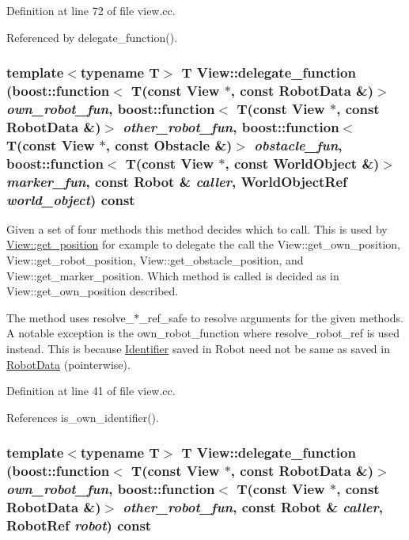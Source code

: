 Definition at line 72 of file view.cc.

Referenced by delegate\_\-function().\hypertarget{class_view_7eccca274db6bd4da79a294e463de06c}{
\subsubsection[delegate\_\-function]{\setlength{\rightskip}{0pt plus 5cm}template$<$typename T$>$ T View::delegate\_\-function (boost::function$<$ T(const {\bf View} $\ast$, const {\bf RobotData} \&)$>$ {\em own\_\-robot\_\-fun}, \/  boost::function$<$ T(const {\bf View} $\ast$, const {\bf RobotData} \&)$>$ {\em other\_\-robot\_\-fun}, \/  boost::function$<$ T(const {\bf View} $\ast$, const Obstacle \&)$>$ {\em obstacle\_\-fun}, \/  boost::function$<$ T(const {\bf View} $\ast$, const {\bf WorldObject} \&)$>$ {\em marker\_\-fun}, \/  const Robot \& {\em caller}, \/  WorldObjectRef {\em world\_\-object}) const}}
\label{class_view_7eccca274db6bd4da79a294e463de06c}


Given a set of four methods this method decides which to call. This is used by \hyperlink{class_view_58fde47c2b683d13f4d038d3e9b37093}{View::get\_\-position} for example to delegate the call the View::get\_\-own\_\-position, View::get\_\-robot\_\-position, View::get\_\-obstacle\_\-position, and View::get\_\-marker\_\-position. Which method is called is decided as in View::get\_\-own\_\-position described.

The method uses resolve\_\-$\ast$\_\-ref\_\-safe to resolve arguments for the given methods. A notable exception is the own\_\-robot\_\-function where resolve\_\-robot\_\-ref is used instead. This is because \hyperlink{class_identifier}{Identifier} saved in Robot need not be same as saved in \hyperlink{class_robot_data}{RobotData} (pointerwise). 

Definition at line 41 of file view.cc.

References is\_\-own\_\-identifier().\hypertarget{class_view_9fce14f4a6491176e28f19d41669a136}{
\subsubsection[delegate\_\-function]{\setlength{\rightskip}{0pt plus 5cm}template$<$typename T$>$ T View::delegate\_\-function (boost::function$<$ T(const {\bf View} $\ast$, const {\bf RobotData} \&)$>$ {\em own\_\-robot\_\-fun}, \/  boost::function$<$ T(const {\bf View} $\ast$, const {\bf RobotData} \&)$>$ {\em other\_\-robot\_\-fun}, \/  const Robot \& {\em caller}, \/  RobotRef {\em robot}) const}}
\label{class_view_9fce14f4a6491176e28f19d41669a136}


